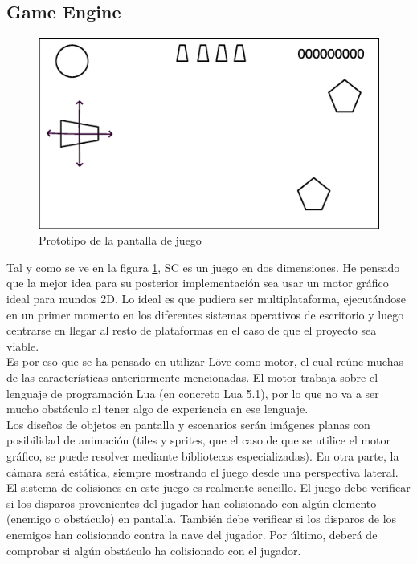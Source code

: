 \documentclass[12pt, spanish, a4paper]{article}
\begin{document}
	\subsection{Game Engine}
	
	\begin{figure}[!htb]
		\centering
		\includegraphics[scale=.5]{prototype.eps}
		\caption{Prototipo de la pantalla de juego}
		\label{fig:prototipo}
	\end{figure}
		
	Tal y como se ve en la figura \ref{fig:prototipo}, SC es un juego en dos dimensiones. He pensado que la mejor idea para su posterior implementación sea usar un motor gráfico ideal para mundos 2D. Lo ideal es que pudiera ser multiplataforma, ejecutándose en un primer momento en los diferentes sistemas operativos de escritorio y luego centrarse en llegar al resto de plataformas en el caso de que el proyecto sea viable. \\
	
	Es por eso que se ha pensado en utilizar Löve como motor, el cual reúne muchas de las características anteriormente mencionadas. El motor trabaja sobre el lenguaje de programación Lua (en concreto Lua 5.1), por lo que no va a ser mucho obstáculo al tener algo de experiencia en ese lenguaje. \\
	
	Los diseños de objetos en pantalla y escenarios serán imágenes planas con posibilidad de animación (tiles y sprites, que el caso de que se utilice el motor gráfico, se puede resolver mediante bibliotecas especializadas). En otra parte, la cámara será estática, siempre mostrando el juego desde una perspectiva lateral. \\
	
	El sistema de colisiones en este juego es realmente sencillo. El juego debe verificar si los disparos provenientes del jugador han colisionado con algún elemento (enemigo o obstáculo) en pantalla. También debe verificar si los disparos de los enemigos han colisionado contra la nave del jugador. Por último, deberá de comprobar si algún obstáculo ha colisionado con el jugador. \\
	
\end{document}
